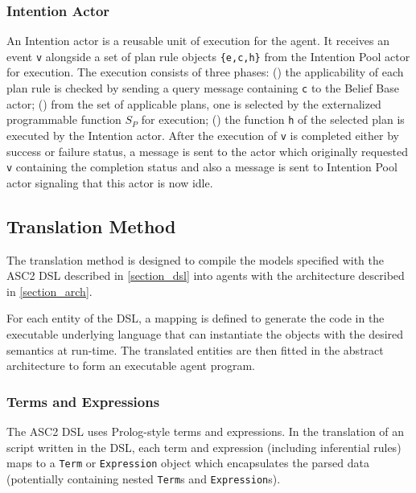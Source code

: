 \subsubsection{Intention Actor}
An Intention actor is a reusable unit of execution for the agent. It receives an event \verb+v+ alongside a set of plan rule objects \verb+{e,c,h}+ from the Intention Pool actor for execution. The execution consists of three phases: () the applicability of each plan rule is checked by sending a query message containing \verb+c+ to the Belief Base actor; () from the set of applicable plans, one is selected by the externalized programmable function $S_P$ for execution; () the function  \verb+h+ of the selected plan is executed by the Intention actor. After the execution of \verb+v+ is completed either by success or failure status, a message is sent to the actor which originally requested \verb+v+ containing the completion status and also a message is sent to Intention Pool actor signaling that this actor is now idle.


\subsection{Translation Method}
The translation method is designed to compile the models specified with the ASC2 DSL described in \ref{section_dsl} into agents with the architecture described in \ref{section_arch}. 

For each entity of the DSL, a mapping is defined to generate the code in the executable underlying language that can instantiate the objects with the desired semantics at run-time. The translated entities are then fitted in the abstract architecture to form an executable agent program.

\subsubsection{Terms and Expressions}
The ASC2 DSL uses Prolog-style terms and expressions. In the translation of an script written in the DSL, each term and expression (including inferential rules) maps to a \verb+Term+ or \verb+Expression+ object which encapsulates the parsed data (potentially containing nested \verb+Term+s and \verb+Expression+s).

